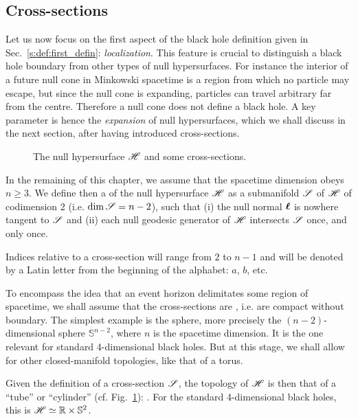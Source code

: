 \subsection{Cross-sections} \label{s:def:spacelike_sections}

Let us now focus on the first aspect of the black hole definition given
in Sec.~\ref{s:def:first_defin}: \emph{localization}.
This feature is crucial to distinguish a black hole boundary from other types
of null hypersurfaces. For instance the interior of a future null cone
in Minkowski spacetime is a region from which no particle may escape,
but since the null cone is expanding, particles can travel arbitrary far from
the centre. Therefore a null cone does not define a black hole.
A key parameter is hence the \emph{expansion} of null hypersurfaces, which we shall
discuss in the next section, after having introduced cross-sections.

\begin{figure}
\vspace{5cm}
\caption[]{\label{f:def:hor_cylinder} \footnotesize
The null hypersurface $\mathscr{H}$ and some cross-sections.}
\end{figure}

In the remaining of this chapter, we assume that the spacetime dimension
obeys $n\geq 3$. We define then a 
of the null hypersurface $\mathscr{H}$
as a submanifold $\mathscr{S}$ of $\mathscr{H}$ of codimension 2 (i.e. $\dim \mathscr{S}=n-2$),
such that (i) the null normal $\bm{\ell}$ is nowhere tangent to $\mathscr{S}$ and (ii)
each null geodesic generator of $\mathscr{H}$ intersects $\mathscr{S}$ once, and only once.

\begin{notation}
Indices relative to a cross-section will range from $2$ to $n-1$ and
will be denoted by a Latin letter from the beginning of the alphabet: $a$, $b$, etc.
\end{notation}

To encompass the idea that an event horizon delimitates some
region of spacetime, we shall assume that the cross-sections
are , i.e.
are compact without boundary. The simplest example is the sphere,
more precisely the $(n-2)$-dimensional sphere $\mathbb{S}^{n-2}$, where $n$
is the spacetime dimension. It is the one relevant for standard 4-dimensional
black holes. But at this stage, we shall allow for other
closed-manifold topologies, like that of a torus.

Given the definition of a cross-section $\mathscr{S}$,
the topology of $\mathscr{H}$ is then that of a ``tube'' or ``cylinder''
(cf. Fig.~\ref{f:def:hor_cylinder}):
\be \label{e:def:H_topology}
    \Hor \simeq \R \times \Sp.
\ee
For the standard 4-dimensional black holes, this is
$\mathscr{H} \simeq \mathbb{R} \times \mathbb{S}^{2}$.

